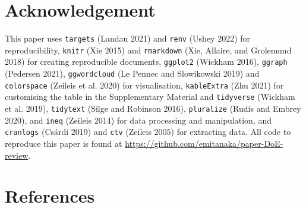 \documentclass{article}
\begin{document}
\hypertarget{pkgs}{%
\section{Acknowledgement}\label{pkgs}}

This paper uses \texttt{targets} (Landau 2021) and \texttt{renv} (Ushey
2022) for reproducibility, \texttt{knitr} (Xie 2015) and
\texttt{rmarkdown} (Xie, Allaire, and Grolemund 2018) for creating
reproducible documents, \texttt{ggplot2} (Wickham 2016), \texttt{ggraph}
(Pedersen 2021), \texttt{ggwordcloud} (Le Pennec and Slowikowski 2019)
and \texttt{colorspace} (Zeileis et al. 2020) for visualisation,
\texttt{kableExtra} (Zhu 2021) for customising the table in the
Supplementary Material and \texttt{tidyverse} (Wickham et al. 2019),
\texttt{tidytext} (Silge and Robinson 2016), \texttt{pluralize} (Rudis
and Embrey 2020), and \texttt{ineq} (Zeileis 2014) for data processing
and manipulation, and \texttt{cranlogs} (Csárdi 2019) and \texttt{ctv}
(Zeileis 2005) for extracting data. All code to reproduce this paper is
found at \url{https://github.com/emitanaka/paper-DoE-review}.

\hypertarget{references}{%
\section*{References}\label{references}}
\end{document}
